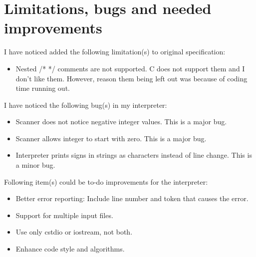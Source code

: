 \documentclass[english,11pt,twoside,a4paper]{article}
\begin{document}
\section{Limitations, bugs and needed improvements}

I have noticed added the following limitation(s) to original specification:
\begin{itemize}
	\item Nested /* */ comments are not supported. C does not support them and I don't like them. However, reason them being left out was because of coding time running out.
\end{itemize}

I have noticed the following bug(s) in my interpreter:
\begin{itemize}
	\item Scanner does not notice negative integer values. This is a major bug.
	\item Scanner allows integer to start with zero. This is a major bug.
	\item Interpreter prints \n signs in strings as characters instead of line change. This is a minor bug.
\end{itemize}

Following item(s) could be to-do improvements for the interpreter:
\begin{itemize}
	\item Better error reporting: Include line number and token that causes the error.
	\item Support for multiple input files.
	\item Use only cstdio or iostream, not both.
	\item Enhance code style and algorithms.
\end{itemize}
\end{document}
